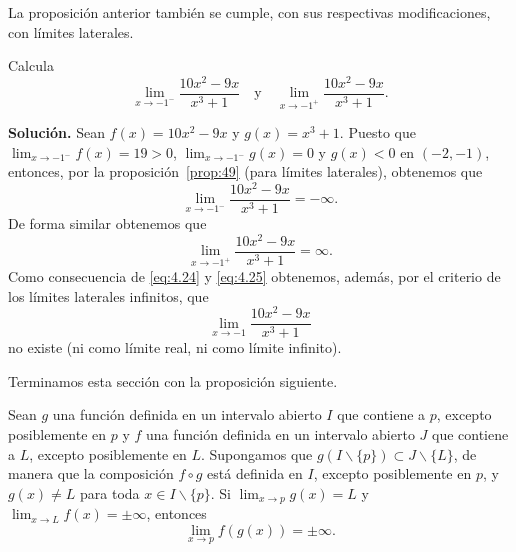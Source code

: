 \documentclass[12pt,a4paper]{book}
\begin{document}
    La proposición anterior también se cumple, con sus respectivas modificaciones,
    con límites laterales.

    \begin{ejemplo}\label{ejm:64}
        Calcula
        \begin{equation*}
            \lim_{x\to -1^{-}}\frac{10x^{2}-9x}{x^{3}+1}\quad\text{y}\quad\lim_{x\to -1^{+}}\frac{10x^{2}-9x}{x^{3}+1}.
        \end{equation*}

        \textbf{Solución.} Sean $f(x)=10x^{2}-9x$ y $g(x)=x^{3}+1$. Puesto que
        $\lim_{x\to -1^{-}}f(x)=19>0$, $\lim_{x\to -1^{-}}g(x)=0$ y $g(x)<0$ en $(-2,-1)$,
        entonces, por la proposición~\ref{prop:49} (para límites laterales), obtenemos que
        \begin{equation}\label{eq:4.24}
            \lim_{x\to -1^{-}}\frac{10x^{2}-9x}{x^{3}+1}=-\infty.
        \end{equation}
        De forma similar obtenemos que
        \begin{equation}\label{eq:4.25}
            \lim_{x\to -1^{+}}\frac{10x^{2}-9x}{x^{3}+1}=\infty.
        \end{equation}
        Como consecuencia de \eqref{eq:4.24} y \eqref{eq:4.25} obtenemos, además, por el criterio de
        los límites laterales infinitos, que
        \begin{equation}\label{eq:4.26}
            \lim_{x\to -1}\frac{10x^{2}-9x}{x^{3}+1}
        \end{equation}
        no existe (ni como límite real, ni como límite infinito).
    \end{ejemplo}

    Terminamos esta sección con la proposición siguiente.

    \begin{proposicion}\label{prop:50}
        Sean $g$
        una función definida en un intervalo abierto $I$ que contiene a $p$, excepto
        posiblemente en $p$ y $f$ una función definida en un intervalo abierto $J$ que contiene
        a $L$, excepto posiblemente en $L$. Supongamos que $g(I\backslash\{p\})\subset J\backslash\{L\}$, de
        manera que la composición $f\circ g$ está definida en $I$, excepto posiblemente en $p$,
        y $g(x)\neq L$ para toda $x\in I\backslash\{p\}$. Si $\lim_{x\to p}g(x)=L$ y $\lim_{x\to L}f(x)=\pm\infty$,
        entonces
        \begin{equation*}
            \lim_{x\to p}f(g(x))=\pm\infty.
        \end{equation*}
    \end{proposicion}
\end{document}
